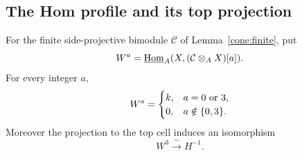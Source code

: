 \subsection{The Hom profile and its top projection}

\begin{proposition}
\label{cone:profile}
For the finite side-projective bimodule $\mathcal C$ of
Lemma~\ref{cone:finite}, put
\[
 W^a=\underline{\operatorname{Hom}}_{A}(X,(\mathcal C\otimes_A X)[a]).
\]
For every integer $a$,
\[
 W^a=\begin{cases}k,&a=0\text{ or }3,\\0,&a\notin\{0,3\}.
 \end{cases}
\]
Moreover the projection to the top cell induces an isomorphism
\begin{equation}
 W^3\xrightarrow{\ \sim\ }H^{-1}.
 \label{cone:top-projection}
\end{equation}
\end{proposition}

